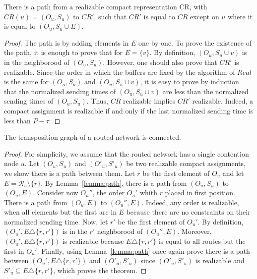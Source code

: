 \begin{lemma}\label{lemma:path}
There is a path from a realizable compact representation CR, with $CR(u) = (O_u,S_u)$ to $CR'$, such that 
$CR'$ is equal to $CR$ except on $u$ where it is equal to $(O_u,S_u \cup E)$.  
\end{lemma}
\begin{proof}
The path is by adding elements in $E$ one by one. 
 To prove the existence of the path, it is enough to prove that for  $E = \{v\}$. By definition, $(O_u,S_u \cup{v})$ is in the neighborood of $(O_u,S_u)$. However, one should also prove that $CR'$ is realizable.
  Since the order in which the buffers are fixed by the algorithm of $Real$ is the same for $(O_u,S_u)$ and $(O_u,S_u \cup{v})$, it is easy to prove by induction that the normalized sending times of $(O_u,S_u \cup{v})$ are less than the normalized sending times of $(O_u,S_u)$. Thus, $CR$ realizable implies $CR'$ realizable. Indeed, 
a compact assignment is realizable if and only if the last normalized sending time is less than $P - \tau$.
\end{proof}



 \begin{theorem}
 The transposition graph of a routed network is connected.
 \end{theorem}
 \begin{proof}
 For simplicity, we assume that the routed network has a single contention node $u$. Let $(O_u,S_u)$ and $(O'_u,S'_u)$ be two realizable compact assignments, we show there is a path between them. Let $r$ be the first element of 
$O_u$ and let $E = \mathcal{R}_u \setminus \{ r \}$. By Lemma~\ref{lemma:path}, there is a path from 
$(O_u,S_u)$ to $(O_u,E)$. Consider now $O_u''$, the order $O_u'$ whith $r$ placed in first position.
There is a path from $(O_u,E)$ to $(O_u'',E)$. Indeed, any order is realizable, when all elements but the first
are in $E$ because there are no constraints on their normalized sending time. 
Now, let $r'$ be the first element of $O_u'$. By definition, $(O_u',E \triangle \{r,r'\})$ is in the $r'$ neighborood of $(O_u'',E)$. Moreover, $(O_u',E \triangle \{r,r'\})$ is realizable because $E \triangle \{r,r'\}$ is equal to all routes but the first in $O_u'$. 
Finally, using Lemma~\ref{lemma:path} once again prove there is a path between $(O_u',E \triangle \{r,r'\})$ and $(O'_u,S'_u)$ since $(O'_u,S'_u)$ is realizable and $S'_u \subseteq E \triangle \{r,r'\}$, which proves the theorem.
 \end{proof}




